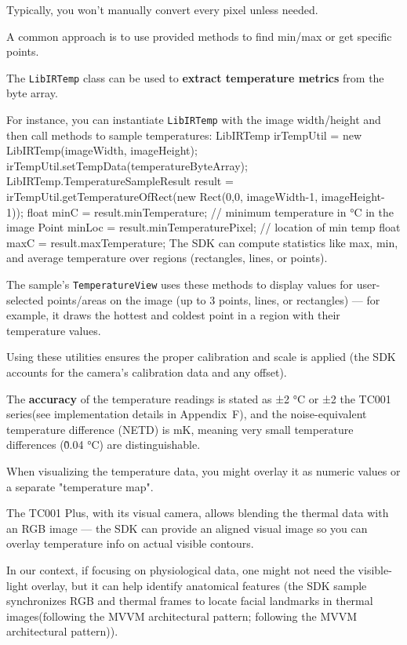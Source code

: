 {Typically, you won't manually convert every pixel unless needed.

A common approach is to use provided methods to find min/max or get specific
points.

The \texttt{LibIRTemp} class can be used to \textbf{extract temperature metrics}
 from the byte array.

For instance, you can instantiate \texttt{LibIRTemp} with the image width/height
and then call methods to sample temperatures: LibIRTemp irTempUtil = new
LibIRTemp(imageWidth, imageHeight);
irTempUtil.setTempData(temperatureByteArray); LibIRTemp.TemperatureSampleResult
result = irTempUtil.getTemperatureOfRect(new Rect(0,0, imageWidth-1,
imageHeight-1)); float minC = result.minTemperature; // minimum temperature in
°C in the image Point minLoc = result.minTemperaturePixel; // location of min
temp float maxC = result.maxTemperature; The SDK can compute statistics like
max, min, and average temperature over regions (rectangles, lines, or points).

The sample's \texttt{TemperatureView} uses these methods to display values for
user-selected points/areas on the image (up to 3 points, lines, or rectangles)
--- for example, it draws the hottest and coldest point in a region with their
temperature values.

Using these utilities ensures the proper calibration and scale is applied (the
SDK accounts for the camera's calibration data and any offset).

The \textbf{accuracy}
of the temperature readings is stated as ±2 °C or ±2%
the TC001 series(see implementation details in Appendix~F), and the
noise-equivalent temperature difference (NETD) is  mK, meaning very small
temperature differences (\~0.04 °C) are distinguishable.

When visualizing the temperature data, you might overlay it as numeric values or
a separate "temperature map".

The TC001 Plus, with its visual camera, allows blending the thermal data with an
RGB image --- the SDK can provide an aligned visual image so you can overlay
temperature info on actual visible contours.

In our context, if focusing on physiological data, one might not need the
visible-light overlay, but it can help identify anatomical features (the SDK
sample synchronizes RGB and thermal frames to locate facial landmarks in thermal
images(following the MVVM architectural pattern; following the MVVM
architectural pattern)).

}
